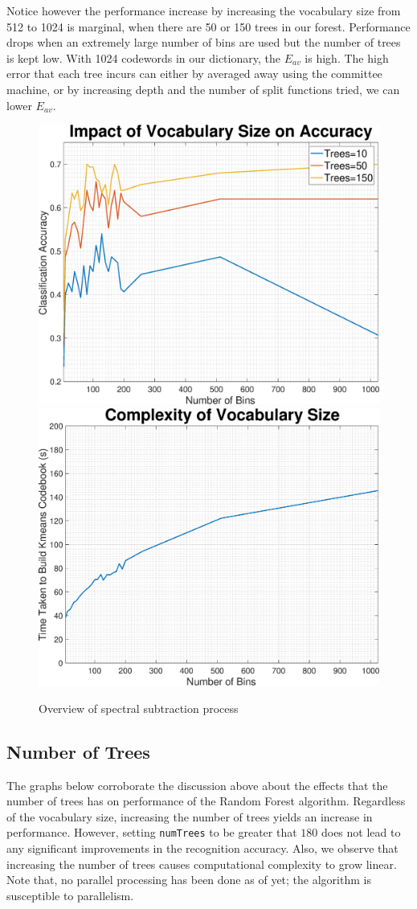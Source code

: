 \documentclass[a4paper,pra,twocolumn,10pt,aps,longbibliography,nobalancelastpage]{revtex4-1}
\begin{document}
Notice however the performance increase by increasing the vocabulary size from 512 to 1024 is marginal, when there are 50 or 150 trees in our forest. Performance drops when an extremely large number of bins are used but the number of trees is kept low. With 1024 codewords in our dictionary, the $E_{av}$ is high. The high error that each tree incurs can either by averaged away using the committee machine, or by increasing depth and the number of split functions tried, we can lower $E_{av}$. 
\begin{figure}[H]
	\centering
    \includegraphics[width=0.49\columnwidth]{numBins_acc}
	\includegraphics[width=0.49\columnwidth]{numBins_complexity}
    \caption{Overview of spectral subtraction process}
\end{figure}

\subsection*{Number of Trees}

The graphs below corroborate the discussion above about the effects that the number of trees has on performance of the Random Forest algorithm. Regardless of the vocabulary size, increasing the number of trees yields an increase in performance. However, setting  \texttt{numTrees} to be greater that $180$ does not lead to any significant improvements in the recognition accuracy. Also, we observe that increasing the number of trees causes computational complexity to grow linear. Note that, no parallel processing has been done as of yet; the algorithm is susceptible to parallelism. 
\end{document}

